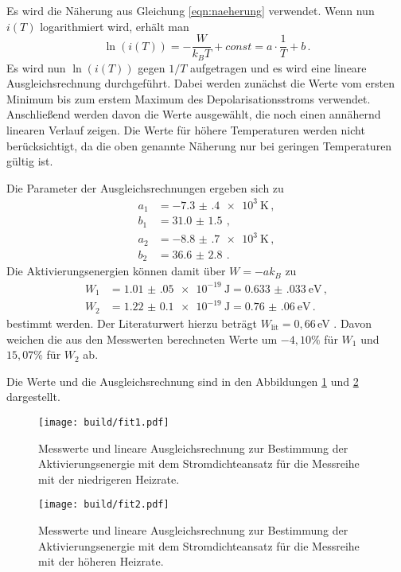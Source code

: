 Es wird die Näherung aus Gleichung \eqref{eqn:naeherung} verwendet. Wenn nun $i(T)$
logarithmiert wird, erhält man
\begin{equation*}
  \ln(i(T))=-\frac{W}{k_B T} + const =a\cdot \frac{1}{T} +b  \,.
\end{equation*}
\cite{Wie lösen wir hier das Problem mit der Einheit im ln?}
Es wird nun $\ln(i(T))$ gegen $1/T$ aufgetragen und es wird eine lineare Ausgleichsrechnung
durchgeführt. Dabei werden zunächst die Werte vom ersten Minimum bis zum erstem Maximum
des Depolarisationsstroms verwendet. Anschließend werden davon die Werte ausgewählt, die
noch einen annähernd linearen Verlauf zeigen. Die Werte für höhere Temperaturen werden
nicht berücksichtigt, da die oben genannte Näherung nur bei geringen
Temperaturen gültig ist.

Die Parameter
der Ausgleichsrechnungen ergeben sich zu
\begin{align*}
  a_1&=\SI{-7.3(4)e+3}{\kelvin} \,, \\
  b_1&=\SI{31.0(15)}{}  \,, \\
  a_2&=\SI{-8.8(7)e+3}{\kelvin} \,, \\
  b_2&=\SI{36.6(28)}{}  \,.
\end{align*}
Die Aktivierungsenergien können damit über $W=-ak_B$ zu
\begin{align*}
 W_1&=\SI{1.01(05)e-19}{\joule}= \SI{0.633(033)}{\eV}  \,, \\
 W_2&=\SI{1.22(010)e-19}{\joule}=\SI{0.76(06)}{\eV} \,.
\end{align*}
bestimmt werden. Der Literaturwert hierzu beträgt $W_{\text{lit}}=0{,}66\,$eV \cite{lit}. Davon weichen
die aus den Messwerten berechneten Werte um $-4{,}10\%$ für $W_1$ und $15{,}07\%$ für
$W_2$ ab.

Die Werte und die Ausgleichsrechnung sind in den Abbildungen \ref{fig:fit1} und
\ref{fig:fit2} dargestellt.

\begin{figure}
  \centering
  \texttt{[image: build/fit1.pdf]}
  \caption{Messwerte und lineare Ausgleichsrechnung zur Bestimmung der Aktivierungsenergie mit dem Stromdichteansatz für
  die Messreihe mit der niedrigeren Heizrate.}
  \label{fig:fit1}
\end{figure}
\begin{figure}
  \centering
  \texttt{[image: build/fit2.pdf]}
  \caption{Messwerte und lineare Ausgleichsrechnung zur Bestimmung der Aktivierungsenergie mit dem Stromdichteansatz für
  die Messreihe mit der höheren Heizrate.}
  \label{fig:fit2}
\end{figure}

